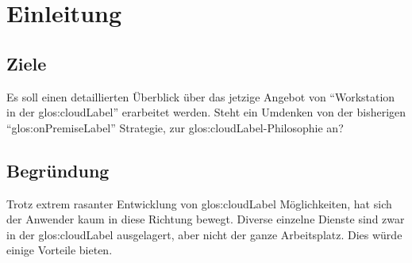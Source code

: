 \chapter{Einleitung}

\section{Ziele}
Es soll einen detaillierten Überblick über das jetzige Angebot von “Workstation in der \Gls{glos:cloudLabel}” erarbeitet werden.
Steht ein Umdenken von der bisherigen "`\gls{glos:onPremiseLabel}"' Strategie, zur \Gls{glos:cloudLabel}-Philosophie an?

\section{Begründung}
Trotz extrem rasanter Entwicklung von \Gls{glos:cloudLabel} Möglichkeiten, hat sich der Anwender kaum in diese Richtung bewegt.
Diverse einzelne Dienste sind zwar in der \Gls{glos:cloudLabel} ausgelagert, aber nicht der ganze Arbeitsplatz. Dies würde einige Vorteile bieten.
